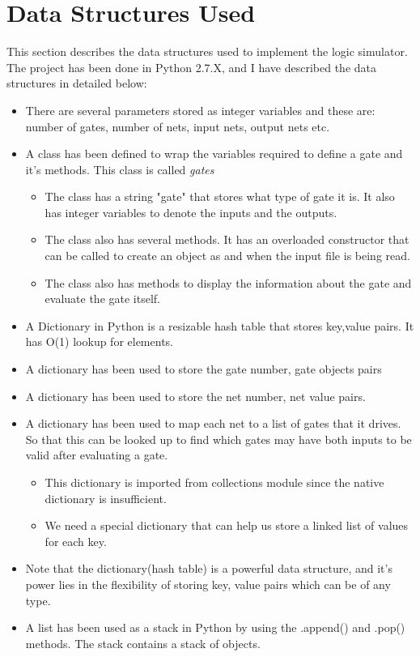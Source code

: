 \documentclass[paper=a4, fontsize=12pt]{scrartcl} %
\numberwithin{equation}{section} %
\numberwithin{figure}{section} %
\numberwithin{table}{section} %
\begin{document}
\section{Data Structures Used}
This section describes the data structures used to implement the logic simulator. The project has been done in Python 2.7.X, and I have described the data structures in detailed below:
\begin{itemize}
\item There are several parameters stored as integer variables and these are: number of gates, number of nets, input nets, output nets etc. 
\item A class has been defined to wrap the variables required to define a gate and it's methods. This class is called \emph{gates} 
	\begin {itemize}
	\item The class has a string "gate" that stores what type of gate it is. It also has integer variables to denote the inputs and the outputs.  
	\item The class also has several methods. It has an overloaded constructor that can be called to create an object as and when the input file is being read. 
	\item The class also has methods to display the information about the gate and evaluate the gate itself. 
	\end {itemize}
\item A Dictionary in Python is a resizable hash table that stores key,value pairs. It has O(1) lookup for elements. 
\item A dictionary has been used to store the gate number, gate objects pairs
\item A dictionary has been used to store the net number, net value pairs.
\item A dictionary has been used to map each net to a list of gates that it drives. So that this can be looked up to find which gates may have both inputs to be valid after evaluating a gate. 
	\begin {itemize}
	\item This dictionary is imported from collections module since the native dictionary is insufficient.
	\item We need a special dictionary that can help us store a linked list of values for each key. 
	\end{itemize}
\item Note that the dictionary(hash table) is a powerful data structure, and it's power lies in the flexibility of storing key, value pairs which can be of any type.
\item A list has been used as a stack in Python by using the .append() and .pop() methods. The stack contains a stack of objects. 
\end{itemize} 
	
\end{document}
